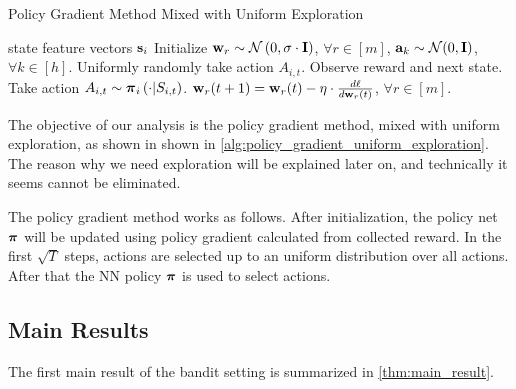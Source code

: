 \begin{algorithm}[h]
   \caption{Policy Gradient Method Mixed with Uniform Exploration}
\label{alg:policy_gradient_uniform_exploration}
\begin{algorithmic}
    state feature vectors ${\mathbf{s}}_i$
   \STATE Initialize ${\mathbf{w}}_r \sim {\mathcal{N}}\left( 0, \sigma \cdot {\mathbf{I}} \right)$, $\forall r \in [m]$, ${\mathbf{a}}_k \sim {\mathcal{N}}(0, {\mathbf{I}})$, $\forall k \in [h]$.
   \STATE Uniformly randomly take action $A_{i,t}$. 
   \STATE Observe reward and next state.
   \ELSE
   \STATE Take action $A_{i,t} \sim {\boldsymbol{\pi}}_{i}\left(\cdot \middle| S_{i,t} \right)$. 
   \ENDIF
   \STATE ${\mathbf{w}}_r(t+1) = {\mathbf{w}}_r(t) - \eta \cdot \frac{d\ell}{d {\mathbf{w}}_r(t)}$, $\forall r \in [m]$.
   \ENDFOR
\end{algorithmic}
\end{algorithm}

The objective of our analysis is the policy gradient method, mixed with uniform exploration, as shown in shown in \cref{alg:policy_gradient_uniform_exploration}. The reason why we need exploration will be explained later on, and technically it seems cannot be eliminated.

The policy gradient method works as follows. After initialization, the policy net ${\boldsymbol{\pi}}$ will be updated using policy gradient calculated from collected reward. In the first $\sqrt{T}$ steps, actions are selected up to an uniform distribution over all actions. After that the NN policy ${\boldsymbol{\pi}}$ is used to select actions.

\subsection{Main Results}
\label{subsec:main_results}

The first main result of the bandit setting is summarized in \cref{thm:main_result}.

